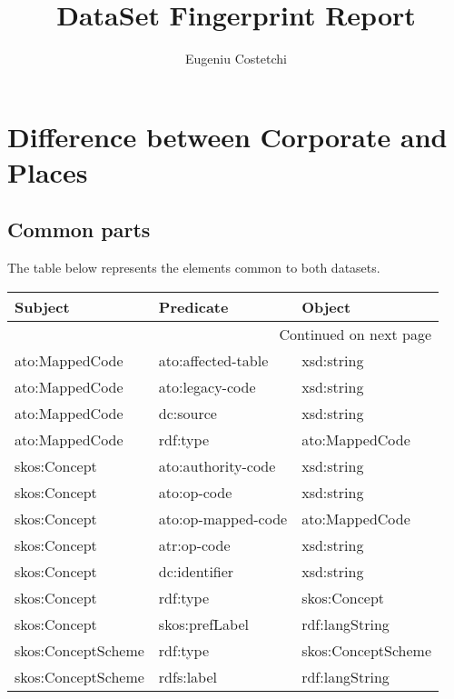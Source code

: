 \documentclass[10pt,a4paper,titlepage,final]{article}
\author{Eugeniu Costetchi}
\title{DataSet Fingerprint Report}
\begin{document}
\maketitle
\tableofcontents
\newpage
\section{Difference between Corporate and Places}
\subsection{Common parts}
The table below represents the elements common to both datasets.
\begin{longtable}{lll}
\toprule
            Subject &           Predicate &              Object \\
\midrule
\endhead
\midrule
\multicolumn{3}{r}{{Continued on next page}} \\
\midrule
\endfoot

\bottomrule
\endlastfoot
     ato:MappedCode &  ato:affected-table &          xsd:string \\
     ato:MappedCode &     ato:legacy-code &          xsd:string \\
     ato:MappedCode &           dc:source &          xsd:string \\
     ato:MappedCode &            rdf:type &      ato:MappedCode \\
       skos:Concept &  ato:authority-code &          xsd:string \\
       skos:Concept &         ato:op-code &          xsd:string \\
       skos:Concept &  ato:op-mapped-code &      ato:MappedCode \\
       skos:Concept &         atr:op-code &          xsd:string \\
       skos:Concept &       dc:identifier &          xsd:string \\
       skos:Concept &            rdf:type &        skos:Concept \\
       skos:Concept &      skos:prefLabel &      rdf:langString \\
 skos:ConceptScheme &            rdf:type &  skos:ConceptScheme \\
 skos:ConceptScheme &          rdfs:label &      rdf:langString \\
\end{longtable}
\end{document}
